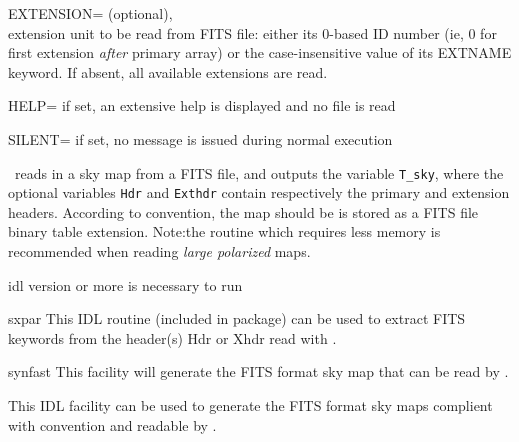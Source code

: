 \begin{qualifiers}
\begin{qulist}{}
       \item[{EXTENSION=}] 
		(optional), \\
	extension unit to be read from FITS file: 
 either its 0-based ID number (ie, 0 for first extension {\em after} primary array) 
 or the case-insensitive value of its EXTNAME keyword.
	If absent, all available extensions are read.
 

  \end{qulist}
\end{qualifiers}

\begin{keywords}
  \begin{kwlist}{} %
   \item[{HELP=}]  if set, an extensive help is displayed and no
	file is read
  \item[{SILENT=}]  if set, no message is issued during normal execution
   \end{kwlist}
\end{keywords}

\begin{codedescription}
{\thedocid\ reads in a \healpix sky map from a FITS file, and outputs
the variable {\tt T\_sky}, where the optional variables {\tt Hdr} 
and {\tt Exthdr} contain
respectively the primary and extension headers. According to \healpix
convention, the map should be is stored as a FITS file binary table
extension. Note:the routine  which requires less
memory is recommended when reading {\em large polarized} maps.}
\end{codedescription}



\begin{related}
  \begin{sulist}{} %
  \item[idl] version \idlversion or more is necessary to run \thedocid

    \item[sxpar] This IDL routine (included in \healpix package) can be
  used to extract FITS keywords from the header(s) Hdr or Xhdr read with \thedocid.
  \item[synfast] This \healpix facility will generate the FITS format 
            sky map that can be read by \thedocid.
  \item[\htmlref{write\_fits\_map}{idl:write_fits_map}] This \healpix IDL facility can be used to generate the FITS format 
            sky maps complient with \healpix convention and readable by \thedocid.
  \end{sulist}
\end{related}


